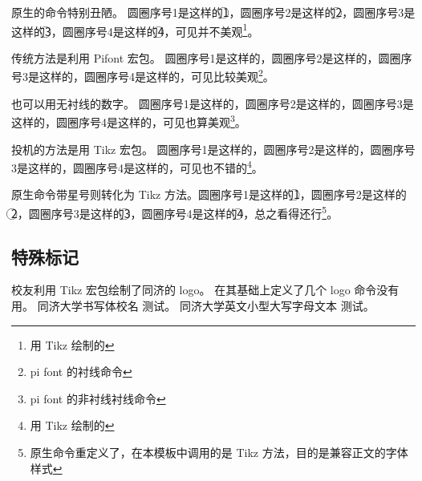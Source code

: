 \documentclass[../Main/thesis]{subfiles}
\begin{document}
原生的命令特别丑陋。
圆圈序号1是这样的\textcircled{1}，圆圈序号2是这样的\textcircled{2}，圆圈序号3是这样的\textcircled{3}，圆圈序号4是这样的\textcircled{4}，可见并不美观\footnote{用 Tikz 绘制的}。

传统方法是利用 Pifont 宏包。
圆圈序号1是这样的，圆圈序号2是这样的，圆圈序号3是这样的，圆圈序号4是这样的，可见比较美观\footnote{pi font 的衬线命令}。

也可以用无衬线的数字。
圆圈序号1是这样的，圆圈序号2是这样的，圆圈序号3是这样的，圆圈序号4是这样的，可见也算美观\footnote{pi font 的非衬线衬线命令}。

投机的方法是用 Tikz 宏包。
圆圈序号1是这样的，圆圈序号2是这样的，圆圈序号3是这样的，圆圈序号4是这样的，可见也不错的\footnote{用 Tikz 绘制的}。

原生命令带星号则转化为 Tikz 方法。圆圈序号1是这样的\textcircled*{1}，圆圈序号2是这样的\textcircled*{2}，圆圈序号3是这样的\textcircled*{3}，圆圈序号4是这样的\textcircled*{4}，总之看得还行\footnote{原生命令重定义了，在本模板中调用的是 Tikz 方法，目的是兼容正文的字体样式}。

\subsection{特殊标记}
校友利用 Tikz 宏包绘制了同济的 logo。
在其基础上定义了几个 logo 命令没有用。
同济大学书写体校名 \tongjiname 测试。
同济大学英文小型大写字母文本 \tongjithesis 测试。
\end{document}
